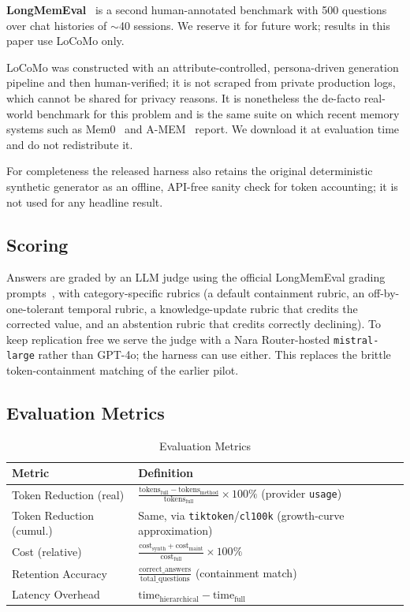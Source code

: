 \documentclass[conference]{IEEEtran}
\begin{document}
\textbf{LongMemEval}~\cite{wu2024longmemeval} is a second human-annotated benchmark with 500 questions over chat histories of $\sim$40 sessions. We reserve it for future work; results in this paper use LoCoMo only.

LoCoMo was constructed with an attribute-controlled, persona-driven
generation pipeline and then human-verified; it is not scraped from private
production logs, which cannot be shared for privacy reasons. It is
nonetheless the de-facto real-world benchmark for this problem and is the same
suite on which recent memory systems such as Mem0~\cite{chhikara2025mem0} and
A-MEM~\cite{xu2025amem} report. We download it at evaluation time and do not
redistribute it.

For completeness the released harness also retains the original deterministic
synthetic generator as an offline, API-free sanity check for token accounting;
it is not used for any headline result.

\subsection{Scoring}
\label{sec:scoring}

Answers are graded by an LLM judge using the official LongMemEval grading
prompts~\cite{wu2024longmemeval}, with category-specific rubrics (a default
containment rubric, an off-by-one-tolerant temporal rubric, a knowledge-update
rubric that credits the corrected value, and an abstention rubric that credits
correctly declining). To keep replication free we serve the judge with a
Nara Router-hosted \texttt{mistral-large} rather than GPT-4o; the harness can
use either. This replaces the brittle token-containment matching of the earlier
pilot.

\subsection{Evaluation Metrics}

\begin{table}[h]
\centering
\caption{Evaluation Metrics}
\label{tab:metrics}
\small
\setlength{\tabcolsep}{3pt}
\begin{tabular}{p{}p{}}
\toprule
\textbf{Metric} & \textbf{Definition} \\
\midrule
Token Reduction (real) & $\frac{\text{tokens}_{\text{full}} - \text{tokens}_{\text{method}}}{\text{tokens}_{\text{full}}} \times 100\%$ (provider \texttt{usage}) \\
Token Reduction (cumul.) & Same, via \texttt{tiktoken}/\texttt{cl100k} (growth-curve approximation) \\
Cost (relative) & $\frac{\text{cost}_{\text{synth}} + \text{cost}_{\text{maint}}}{\text{cost}_{\text{full}}} \times 100\%$ \\
Retention Accuracy & $\frac{\text{correct\_answers}}{\text{total\_questions}}$ (containment match) \\
Latency Overhead & $\text{time}_{\text{hierarchical}} - \text{time}_{\text{full}}$ \\
\bottomrule
\end{tabular}
\end{table}
\end{document}

